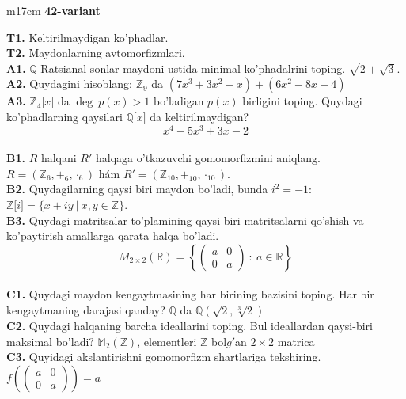 \documentclass{article}
\begin{document}
\begin{tabular}{m{17cm}}
\textbf{42-variant}
\newline

\textbf{T1.} Keltirilmaydigan ko'phadlar. \\
\textbf{T2.} Maydonlarning avtomorfizmlari. \\
\textbf{A1.} \(\mathbb{Q}\) Ratsianal sonlar maydoni ustida minimal ko'phadalrini toping.
\(\sqrt{2 + \sqrt{3}}\). \\
\textbf{A2.} Quydagini hisoblang:
\(\mathbb{Z}_{9}\) da \(\left( 7x^{3} + 3x^{2} - x \right) + \left( 6x^{2} - 8x + 4 \right)\) \\
\textbf{A3.} \(\mathbb{Z}_{4}\lbrack x\rbrack\) da \(\deg\ p(x) > 1\) bo'ladigan \(p(x)\) birligini toping. Quydagi ko'phadlarning qaysilari \(\mathbb{Q\lbrack}x\rbrack\) da keltirilmaydigan?
\[x^{4} - 5x^{3} + 3x - 2\] \\
\textbf{B1.} \(R\) halqani \(R'\) halqaga o'tkazuvchi gomomorfizmini aniqlang.
\(R = (\mathbb{Z}_{6}, +_{6}, \cdot_{6})\) hám \(R' = (\mathbb{Z}_{10}, +_{10}, \cdot_{10})\). \\
\textbf{B2.} Quydagilarning qaysi biri maydon bo'ladi, bunda \(i^{2} = - 1\):
\(\mathbb{Z\lbrack}i\rbrack = \{ x + iy\ |\ x,y \in \mathbb{Z\}}\). \\
\textbf{B3.} Quydagi matritsalar to'plamining qaysi biri matritsalarni qo'shish va ko'paytirish amallarga qarata halqa bo'ladi.
\[M_{2 \times 2}\mathbb{(R) =}\left\{ \begin{pmatrix}
a & 0 \\
0 & a
\end{pmatrix}\ :\ a \in \mathbb{R} \right\}\] \\
\textbf{C1.} Quydagi maydon kengaytmasining har birining bazisini toping. Har bir kengaytmaning darajasi qanday?
\(\mathbb{Q}\) da \(\mathbb{Q}\left( \sqrt{2},\sqrt[3]{2} \right)\) \\
\textbf{C2.} Quydagi halqaning barcha ideallarini toping. Bul ideallardan qaysi-biri maksimal bo'ladi?
\(\mathbb{M}_{2}\left( \mathbb{Z} \right)\), elementleri \(\mathbb{Z}\) bol\(g'\)an \(2 \times 2\) matrica \\
\textbf{C3.} Quyidagi akslantirishni gomomorfizm shartlariga tekshiring. \(f\left( \begin{pmatrix}
a & 0 \\
0 & a
\end{pmatrix} \right) = a\) \\

\end{tabular}
\vspace{1cm}
\end{document}
